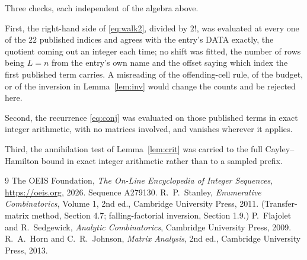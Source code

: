 \documentclass[11pt,a4paper]{article}
\theoremstyle{plain}
\theoremstyle{definition}
\begin{document}
Three checks, each independent of the algebra above.

First, the right-hand side of \eqref{eq:walk2}, divided by $2!$, was evaluated at every
one of the $22$ published indices and agrees with the entry's DATA exactly, the quotient
coming out an integer each time; no shift was fitted, the number of rows being
$L=n$ from the entry's own name and the offset saying which index the first published
term carries. A misreading of the offending-cell rule, of the budget, or of the inversion in
Lemma~\ref{lem:inv} would change the counts and be rejected here.

Second, the recurrence \eqref{eq:conj} was evaluated on those published terms in exact
integer arithmetic, with no matrices involved, and vanishes wherever it applies.

Third, the annihilation test of Lemma~\ref{lem:crit} was carried to the full
Cayley--Hamilton bound in exact integer arithmetic rather than to a sampled prefix.

\begin{thebibliography}{9}
 The OEIS Foundation, \emph{The On-Line Encyclopedia of Integer
Sequences}, \url{https://oeis.org}, 2026. Sequence A279130.
 R.~P.~Stanley, \emph{Enumerative Combinatorics}, Volume 1, 2nd ed.,
Cambridge University Press, 2011. (Transfer-matrix method, Section 4.7; falling-factorial
inversion, Section 1.9.)
 P.~Flajolet and R.~Sedgewick, \emph{Analytic Combinatorics}, Cambridge
University Press, 2009.
 R.~A.~Horn and C.~R.~Johnson, \emph{Matrix Analysis}, 2nd ed., Cambridge
University Press, 2013.
\end{thebibliography}
\end{document}
